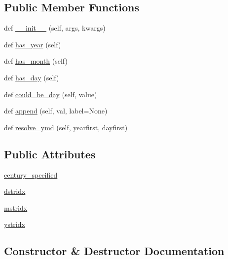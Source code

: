 \subsection*{Public Member Functions}
\begin{DoxyCompactItemize}
\item 
def \hyperlink{classdateutil_1_1parser_1_1__parser_1_1__ymd_a95855d2c34c4605cf9b43ed3cbce2ee5}{\+\_\+\+\_\+init\+\_\+\+\_\+} (self, args, kwargs)
\item 
def \hyperlink{classdateutil_1_1parser_1_1__parser_1_1__ymd_a579f47d50033f8949b0aea65ce397a76}{has\+\_\+year} (self)
\item 
def \hyperlink{classdateutil_1_1parser_1_1__parser_1_1__ymd_a5fc2534b3b5bbba3e3da869006a3536b}{has\+\_\+month} (self)
\item 
def \hyperlink{classdateutil_1_1parser_1_1__parser_1_1__ymd_a0b0024b1c080c1d6f310968bd2085ad9}{has\+\_\+day} (self)
\item 
def \hyperlink{classdateutil_1_1parser_1_1__parser_1_1__ymd_a89fd4c0ca40e5fbc2c2715f24ef39af6}{could\+\_\+be\+\_\+day} (self, value)
\item 
def \hyperlink{classdateutil_1_1parser_1_1__parser_1_1__ymd_ad8f28b2a08b2d61a711844887d02c8e1}{append} (self, val, label=None)
\item 
def \hyperlink{classdateutil_1_1parser_1_1__parser_1_1__ymd_a348a89e2f926f101d7aa2593b5f16d70}{resolve\+\_\+ymd} (self, yearfirst, dayfirst)
\end{DoxyCompactItemize}
\subsection*{Public Attributes}
\begin{DoxyCompactItemize}
\item 
\hyperlink{classdateutil_1_1parser_1_1__parser_1_1__ymd_a6e4e7d1528aaa2b1dfc9e3a04f8e0077}{century\+\_\+specified}
\item 
\hyperlink{classdateutil_1_1parser_1_1__parser_1_1__ymd_abb99e8a1773af4c83731658231406a23}{dstridx}
\item 
\hyperlink{classdateutil_1_1parser_1_1__parser_1_1__ymd_a9d0b113c1f98d5266ecd153fcab5f0ad}{mstridx}
\item 
\hyperlink{classdateutil_1_1parser_1_1__parser_1_1__ymd_ace6c370bbc8ac0605b9016f9fa5e7cbb}{ystridx}
\end{DoxyCompactItemize}


\subsection{Constructor \& Destructor Documentation}
\mbox{\label{classdateutil_1_1parser_1_1__parser_1_1__ymd_a95855d2c34c4605cf9b43ed3cbce2ee5}} 
